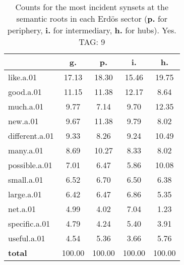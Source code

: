 \begin{table}[h!]
\begin{center}
\begin{tabular}{| l || c | c | c | c |}\hline
 & {\bf g.} & {\bf p.} & {\bf i.} & {\bf h.} \\\hline\hline
like.a.01 & 17.13  & 18.30  & 15.46  & 19.75 \\\hline
good.a.01 & 11.15  & 11.38  & 12.17  & 8.64 \\\hline
much.a.01 & 9.77  & 7.14  & 9.70  & 12.35 \\\hline
new.a.01 & 9.67  & 11.38  & 9.79  & 8.02 \\\hline
different.a.01 & 9.33  & 8.26  & 9.24  & 10.49 \\\hline
many.a.01 & 8.69  & 10.27  & 8.33  & 8.02 \\\hline
possible.a.01 & 7.01  & 6.47  & 5.86  & 10.08 \\\hline
small.a.01 & 6.52  & 6.70  & 6.50  & 6.38 \\\hline
large.a.01 & 6.42  & 6.47  & 6.86  & 5.35 \\\hline
net.a.01 & 4.99  & 4.02  & 7.04  & 1.23 \\\hline
specific.a.01 & 4.79  & 4.24  & 5.40  & 3.91 \\\hline
useful.a.01 & 4.54  & 5.36  & 3.66  & 5.76 \\\hline\hline
{{\bf total}} & 100.00  & 100.00  & 100.00  & 100.00 \\\hline
\end{tabular}
\caption{Counts for the most incident synsets at the semantic roots in each Erd\"os sector ({\bf p.} for periphery, {\bf i.} for intermediary, {\bf h.} for hubs). Yes. TAG: 9}
\end{center}
\end{table}